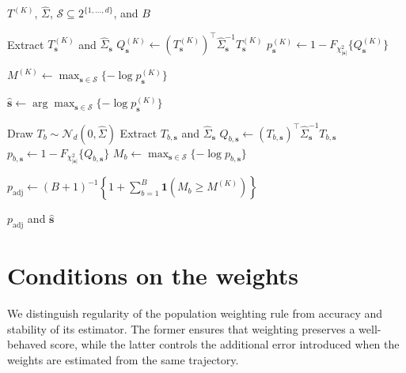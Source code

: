 \documentclass[12pt]{article}
\numberwithin{equation}{section}
\begin{document}
\begin{algorithm}[htbp]
\caption{Monte Carlo calibration of the adaptive maximum GTCM}
\label{alg:bootstrap_subset}
\begin{algorithmic}[1]

\Require $T^{(K)}$, $\hat\Sigma$,
         $\mathcal S\subseteq 2^{\{1,\ldots,d\}}$, and $B$

    \State Extract
        $T_{\pmb{s}}^{(K)}$
        and $\hat\Sigma_{\pmb{s}}$
    \State $Q_{\pmb{s}}^{(K)}
        \gets
        (T_{\pmb{s}}^{(K)})^\top
        \hat\Sigma_{\pmb{s}}^{-1}
        T_{\pmb{s}}^{(K)}$
    \State $p_{\pmb{s}}^{(K)}
        \gets
        1-F_{\chi^2_{|\pmb{s}|}}
        \{Q_{\pmb{s}}^{(K)}\}$
\EndFor

\State $M^{(K)}
    \gets
    \max_{\pmb{s}\in\mathcal S}
    \{-\log p_{\pmb{s}}^{(K)}\}$

\State $\hat{\pmb{s}}
    \gets
    \arg\max_{\pmb{s}\in\mathcal S}
    \{-\log p_{\pmb{s}}^{(K)}\}$

    \State Draw $T_b\sim\mathcal N_d(0,\hat\Sigma)$
        \State Extract
            $T_{b,\pmb{s}}$
            and $\hat\Sigma_{\pmb{s}}$
        \State $Q_{b,\pmb{s}}
            \gets
            (T_{b,\pmb{s}})^\top
            \hat\Sigma_{\pmb{s}}^{-1}
            T_{b,\pmb{s}}$
        \State $p_{b,\pmb{s}}
            \gets
            1-F_{\chi^2_{|\pmb{s}|}}
            \{Q_{b,\pmb{s}}\}$
    \EndFor
    \State $M_b
        \gets
        \max_{\pmb{s}\in\mathcal S}
        \{-\log p_{b,\pmb{s}}\}$
\EndFor

\State $p_{\mathrm{adj}}
    \gets
    (B+1)^{-1}
    \left\{
        1+\sum_{b=1}^B
        \mathbf 1(M_b\geq M^{(K)})
    \right\}$

\Ensure $p_{\mathrm{adj}}$ and $\hat{\pmb{s}}$

\end{algorithmic}
\end{algorithm}




\section{Conditions on the weights}
\label{app:weight-assumptions}

We distinguish regularity of the population weighting rule from accuracy and
stability of its estimator. The former ensures that weighting preserves a
well-behaved score, while the latter controls the additional error introduced
when the weights are estimated from the same trajectory.
\end{document}
